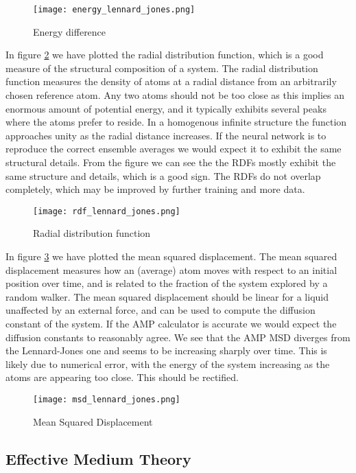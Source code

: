 \begin{figure}[h]
    \centering
    \texttt{[image: energy\_lennard\_jones.png]}
    \caption{Energy difference}
    \label{fig:energy}
\end{figure}

In figure \ref{fig:rdf} we have plotted the radial distribution function,
which is a good measure of the structural composition of a system.
The radial distribution function measures the density of atoms
at a radial distance from an arbitrarily chosen reference atom.
Any two atoms should not be too close as this implies an enormous
amount of potential energy, and it typically exhibits several
peaks where the atoms prefer to reside. In a homogenous infinite
structure the function approaches unity as the radial distance increases.
If the neural network is to reproduce the correct ensemble averages
we would expect it to exhibit the same structural details.
From the figure we can see the the RDFs mostly exhibit the same
structure and details, which is a good sign. The RDFs do not
overlap completely, which may be improved by further training and 
more data.

\begin{figure}[h]
    \centering
    \texttt{[image: rdf\_lennard\_jones.png]}
    \caption{Radial distribution function}
    \label{fig:rdf}
\end{figure}

In figure \ref{fig:msd} we have plotted the mean squared displacement.
The mean squared displacement measures how an (average) atom
moves with respect to an initial position over time,
and is related to the fraction of the system explored by a random walker.
The mean squared displacement should be linear for a liquid
unaffected by an external force, and can be used to compute
the diffusion constant of the system. If the AMP calculator is accurate
we would expect the diffusion constants to reasonably agree.
We see that the AMP MSD diverges from the Lennard-Jones one
and seems to be increasing sharply over time. This is likely
due to numerical error, with the energy of the system increasing
as the atoms are appearing too close. This should be rectified.

\begin{figure}[h]
    \centering
    \texttt{[image: msd\_lennard\_jones.png]}
    \caption{Mean Squared Displacement}
    \label{fig:msd}
\end{figure}

\subsection{Effective Medium Theory}


